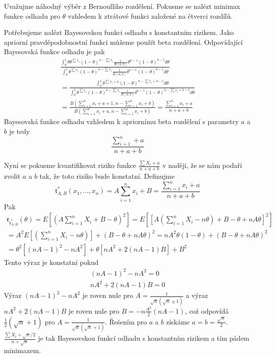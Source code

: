 \begin{example}
Uvažujme náhodný výběr z Bernoulliho rozdělení. Pokusme se nalézt minimax funkce odhadu pro $\theta$ vzhledem k ztrátové funkci založené na čtverci rozdílů.

Potřebujeme nalézt Bayesovskou funkci odhadu s konstantním rizikem. Jako apriorní pravděpodobnostní funkci můžeme použít beta rozdělení. Odpovídající Bayesovská funkce odhadu je pak
\begin{gather*}
\frac{\int_0^1 \theta \theta^{\sum x_i}(1 - \theta)^{n - \sum x_i}\frac{1}{B(a,b)}\theta^{a - 1}(1 - \theta)^{b-1}d \theta}{\int_0^1 \theta^{\sum x_i}(1 - \theta)^{n - \sum x_i}\frac{1}{B(a,b)}\theta^{a - 1}(1 - \theta)^{b - 1} d \theta}\\
= \frac{\int_0^1 \theta^{\sum x_i + a}(1 - \theta)^{n - \sum x_i + b - 1}d \theta}{\int_0^1 \theta^{\sum x_i}(1 - \theta)^{n - \sum x_i}\frac{1}{B(a, b)} \theta^{a - 1}(1 - \theta)^{n - \sum  x_i + b - 1}d \theta}\\
= \frac{B\left(\sum_{i = 1}^n x_i + a + 1, n - \sum_{i = 1}^n x_i + b\right)}{B \left(\sum_{i = 1}^n x_i + a, n - \sum_{i = 1}^n x_i + b\right)} = \frac{\sum_{i = 1}^n x_i + a}{n + a + b}
\end{gather*}
Bayesovská funkce odhadu vzhledem k apriornímu beta rozdělení s parametry $a$ a $b$ je tedy
\begin{equation*}
\frac{\sum_{i = 1}^n + a}{n + a + b}
\end{equation*}

Nyní se pokusme kvantifikovat riziko funkce $\frac{\sum X_i + a}{n + a + b}$ v naději, že se nám podaří zvolit $a$ a $b$ tak, že toto riziko bude konstatní. Definujme
\begin{equation*}
\mathfrak{t}^*_{A,B}(x_1, ..., x_n) = A \sum_{i = 1}^n x_i + B = \frac{\sum_{i = 1}^n x_i + a}{n + a + b}
\end{equation*}
Pak
\begin{gather*}
\mathfrak{r}_{\mathfrak{t}^*_{A,B}}(\theta) = E[(A\sum_{i = 1}^n X_i + B - \theta)^2] = E\left[\left[A \left(\sum_{i = 1}^n X_i - n \theta \right) + B - \theta + n A \theta\right]^2\right]\\
= A^2 E\left[\left(\sum_{i = 1}^n X_i - n \theta \right)\right] + (B - \theta + n A \theta)^2 = n A^2 \theta (1 - \theta) + (B - \theta + n A \theta)^2\\
= \theta^2 [(nA - 1)^2 - n A^2] + \theta[n A^2 + 2(nA - 1)B] + B^2
\end{gather*}
Tento výraz je konstatní pokud
\begin{gather*}
(nA - 1)^2 - n A^2 = 0\\
n A^2 + 2(nA - 1)B = 0
\end{gather*}
Výraz $(nA - 1)^2 - n A^2$ je roven nule pro $A = \frac{1}{\sqrt{n}(\sqrt{n} \pm 1)}$ a výraz $n A^2 + 2(nA - 1)B$ je roven nule pro $B = -n\frac{A^2}{2}(nA - 1)$, což odpovídá $\frac{1}{2}(\sqrt{n} + 1)$ pro $A = \frac{1}{\sqrt{n}(\sqrt{n} + 1)}$. Řešením pro $a$ a $b$ získáme $a = b = \frac{\sqrt{n}}{2}$. $\frac{\sum X_i + \sqrt{n}/2}{n + \sqrt{n}}$ je tak Bayesovskou funkcí odhadu s konstantním rizikem a tím pádem minimaxem.
\end{example}

